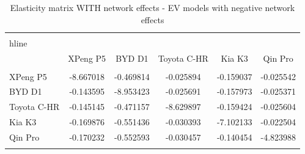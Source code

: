 \begin{table}[!htbp]
\centering
\begin{tabular}{@{\extracolsep{5pt}}lccccc}
\\[-1.8ex]\hline
\\hline \\[-1.8ex]
& XPeng P5 & BYD D1 & Toyota C-HR & Kia K3 & Qin Pro \\
\hline \\[-1.8ex]
XPeng P5 & -8.667018 & -0.469814 & -0.025894 & -0.159037 & -0.025542 \\
BYD D1 & -0.143595 & -8.953423 & -0.025691 & -0.157973 & -0.025371 \\
Toyota C-HR & -0.145145 & -0.471157 & -8.629897 & -0.159424 & -0.025604 \\
Kia K3 & -0.169876 & -0.551436 & -0.030393 & -7.102133 & -0.022504 \\
Qin Pro & -0.170232 & -0.552593 & -0.030457 & -0.140454 & -4.823988 \\
\hline \\[-1.8ex]
\end{tabular}
\caption{Elasticity matrix WITH network effects - EV models with negative network effects}
\end{table}
